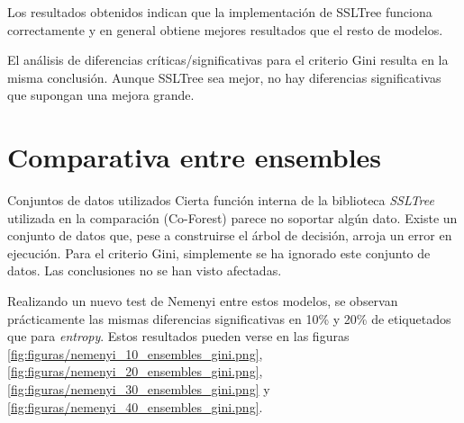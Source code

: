 
Los resultados obtenidos indican que la implementación de SSLTree funciona correctamente y en general obtiene mejores resultados que el resto de modelos.

El análisis de diferencias críticas/significativas para el criterio Gini resulta en la misma conclusión. Aunque SSLTree sea mejor, no hay diferencias significativas que supongan una mejora grande.





\section{Comparativa entre ensembles}

\begin{mainbox}{Conjuntos de datos utilizados}
    Cierta función interna de la biblioteca \textit{SSLTree} utilizada en la comparación (Co-Forest) parece no soportar algún dato. Existe un conjunto de datos que, pese a construirse el árbol de decisión, arroja un error en ejecución. Para el criterio Gini, simplemente se ha ignorado este conjunto de datos. Las conclusiones no se han visto afectadas.
\end{mainbox}


Realizando un nuevo test de Nemenyi entre estos modelos, se observan prácticamente las mismas diferencias significativas en 10\% y 20\% de etiquetados que para \textit{entropy}. Estos resultados pueden verse en las figuras \ref{fig:figuras/nemenyi_10_ensembles_gini.png}, \ref{fig:figuras/nemenyi_20_ensembles_gini.png}, \ref{fig:figuras/nemenyi_30_ensembles_gini.png} y \ref{fig:figuras/nemenyi_40_ensembles_gini.png}.

